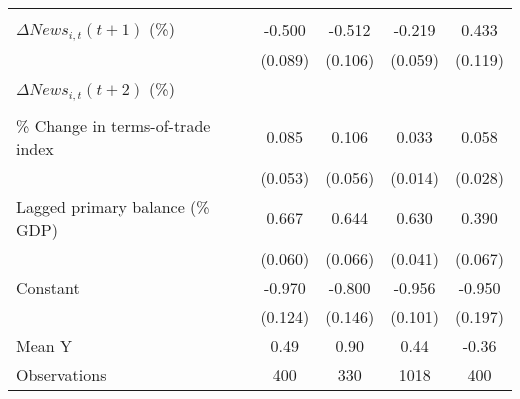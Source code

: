 {\begin{tabular}{l*{4}{c}}
                    &                     &                     &                     &                     \\
\addlinespace
$ \Delta News_{i,t}(t+1)$ (\%)&      -0.500\sym{***}&      -0.512\sym{***}&      -0.219\sym{***}&       0.433\sym{***}\\
                    &     (0.089)         &     (0.106)         &     (0.059)         &     (0.119)         \\
\addlinespace
$ \Delta News_{i,t}(t+2)$ (\%)&                     &                     &                     &                     \\
                    &                     &                     &                     &                     \\
\addlinespace
\% Change in terms-of-trade index&       0.085         &       0.106\sym{*}  &       0.033\sym{**} &       0.058\sym{**} \\
                    &     (0.053)         &     (0.056)         &     (0.014)         &     (0.028)         \\
\addlinespace
Lagged primary balance (\% GDP)&       0.667\sym{***}&       0.644\sym{***}&       0.630\sym{***}&       0.390\sym{***}\\
                    &     (0.060)         &     (0.066)         &     (0.041)         &     (0.067)         \\
\addlinespace
Constant            &      -0.970\sym{***}&      -0.800\sym{***}&      -0.956\sym{***}&      -0.950\sym{***}\\
                    &     (0.124)         &     (0.146)         &     (0.101)         &     (0.197)         \\
\midrule
Mean Y              &        0.49         &        0.90         &        0.44         &       -0.36         \\
Observations        &         400         &         330         &        1018         &         400         \\
\bottomrule
\end{tabular}
}
